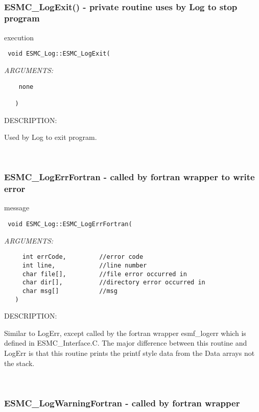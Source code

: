 \mbox{}\hrulefill\ 
 

  \subsubsection [ESMC\_LogExit()] {ESMC\_LogExit() - private routine uses by Log to stop program}


                               execution
\begin{verbatim} 
 void ESMC_Log::ESMC_LogExit(
 \end{verbatim}{\em ARGUMENTS:}
\begin{verbatim}    none
 
   )
 \end{verbatim}
{\sf DESCRIPTION:\\ }


   Used by Log to exit program.
   
 
\mbox{}\hrulefill\ 
 

  \subsubsection [ESMC\_LogErrFortran] {ESMC\_LogErrFortran - called by fortran wrapper to write error}


                                   message
\begin{verbatim} 
 void ESMC_Log::ESMC_LogErrFortran(
 \end{verbatim}{\em ARGUMENTS:}
\begin{verbatim} 
     int errCode,         //error code
     int line,            //line number
     char file[],         //file error occurred in
     char dir[],          //directory error occurred in
     char msg[]           //msg
   )\end{verbatim}
{\sf DESCRIPTION:\\ }


  Similar to LogErr, except called by the fortran wrapper
  esmf\_logerr which is defined in
  ESMC\_Interface.C.  The major difference between this routine
  and LogErr is that this
  routine prints the printf style data from the Data arrays not the stack. 
 
\mbox{}\hrulefill\ 
 
\subsubsection [ESMC\_LogWarningFortran] {ESMC\_LogWarningFortran - called by fortran wrapper}


